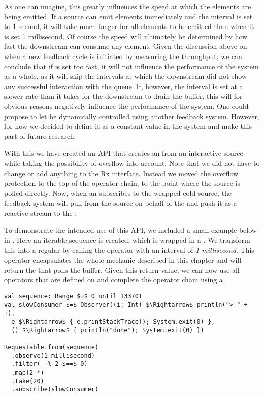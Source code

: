 As one can imagine, this greatly influences the speed at which the elements are being emitted. If a source can emit elements immediately and the interval is set to 1 second, it will take much longer for all elements to be emitted than when it is set 1 millisecond. Of course the speed will ultimately be determined by how fast the downstream can consume any element. Given the discussion above on when a new feedback cycle is initiated by measuring the throughput, we can conclude that if  is set too fast, it will not influence the performance of the system as a whole, as it will skip the intervals at which the downstream did not show any successful interaction with the queue. If, however, the interval is set at a slower rate than it takes for the downstream to drain the buffer, this will for obvious reasons negatively influence the performance of the system. One could propose to let  be dynamically controlled using another feedback system. However, for now we decided to define it as a constant value in the system and make this part of future research.

With this we have created an API that creates an \obs from an interactive source while taking the possibility of overflow into account. Note that we did not have to change or add anything to the Rx interface. Instead we moved the overflow protection to the top of the operator chain, to the point where the source is polled directly. Now, when an \obv subscribes to the wrapped cold source, the feedback system will pull from the source on behalf of the \obv and push it as a reactive stream to the \obv.

To demonstrate the intended use of this API, we included a small example below in . Here an iterable sequence is created, which is wrapped in a . We transform this into a regular \obs by calling the  operator with an interval of \textit{1 millisecond}. This operator encapsulates the whole mechanic described in this chapter and will return the \obs that polls the buffer. Given this return value, we can now use all operators that are defined on \obs and complete the operator chain using a .

\begin{minipage}{\linewidth}
\begin{lstlisting}[style=ScalaStyle, caption={Using the Requestable API to control the flow of a source}, label={lst:requestable-api-usage}]
val sequence: Range $=$ 0 until 133701
val slowConsumer $=$ Observer((i: Int) $\Rightarrow$ println("> " + i),
  e $\Rightarrow$ { e.printStackTrace(); System.exit(0) },
  () $\Rightarrow$ { println("done"); System.exit(0) })
		
Requestable.from(sequence)
  .observe(1 millisecond)
  .filter(_ % 2 $==$ 0)
  .map(2 *)
  .take(20)
  .subscribe(slowConsumer)
\end{lstlisting}
\end{minipage}
